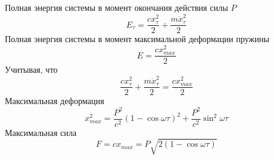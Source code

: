 \documentclass[11pt, compress]{beamer}
\begin{document}
\begin{frame}[t]
Полная энергия системы в момент окончания действия силы $P$
\begin{equation}
	E_\tau = \frac{c x_\tau^2}{2} + \frac{m \dot{x}_\tau^2}{2}
\end{equation}
Полная энергия системы в момент максимальной деформации пружины
\begin{equation}
	E = \frac{c x_{max}^2}{2} 
\end{equation}
Учитывая, что 
$$
	\frac{c x_\tau^2}{2} + \frac{m \dot{x}_\tau^2}{2} = \frac{c x_{max}^2}{2} 
$$
Максимальная деформация
\begin{equation}
	x_{max}^2 = \frac{P^2}{c^2}\left( 1-\cos \omega \tau \right)^2+\frac{P^2} {c^2} \sin^2 \omega \tau  
\end{equation}
Максимальная сила
\begin{equation}
	F = c x_{max} = P \sqrt{2 (1-\cos \omega \tau)}
\end{equation}

	
\end{frame}
\end{document}
